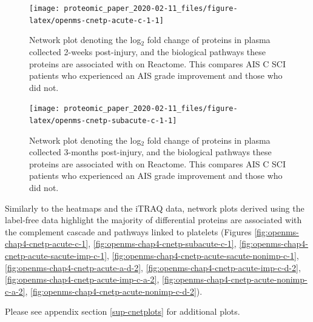 \documentclass[9pt,lineno]{elife}
\begin{document}
\begin{landscape}



\begin{figure}

{\centering \texttt{[image: proteomic\_paper\_2020-02-11\_files/figure-latex/openms-cnetp-acute-c-1-1]} 

}

\caption{Network plot denoting the log\(_2\) fold change of proteins in plasma collected 2-weeks post-injury, and the biological pathways these proteins are associated with on Reactome. This compares AIS C SCI patients who experienced an AIS grade improvement and those who did not.}\label{fig:openms-cnetp-acute-c-1}
\end{figure}

\end{landscape}
\begin{landscape}



\begin{figure}

{\centering \texttt{[image: proteomic\_paper\_2020-02-11\_files/figure-latex/openms-cnetp-subacute-c-1-1]} 

}

\caption{Network plot denoting the log\(_2\) fold change of proteins in plasma collected 3-months post-injury, and the biological pathways these proteins are associated with on Reactome. This compares AIS C SCI patients who experienced an AIS grade improvement and those who did not.}\label{fig:openms-cnetp-subacute-c-1}
\end{figure}

\end{landscape}

\clearpage

Similarly to the heatmaps and the iTRAQ data, network plots derived using the label-free data highlight the majority of differential proteins are associated with the complement cascade and pathways linked to platelets (Figures \ref{fig:openms-chap4-cnetp-acute-c-1}, \ref{fig:openms-chap4-cnetp-subacute-c-1}, \ref{fig:openms-chap4-cnetp-acute-sacute-imp-c-1}, \ref{fig:openms-chap4-cnetp-acute-sacute-nonimp-c-1}, \ref{fig:openms-chap4-cnetp-acute-a-d-2}, \ref{fig:openms-chap4-cnetp-acute-imp-c-d-2}, \ref{fig:openms-chap4-cnetp-acute-imp-c-a-2}, \ref{fig:openms-chap4-cnetp-acute-nonimp-c-a-2}, \ref{fig:openms-chap4-cnetp-acute-nonimp-c-d-2}).

Please see appendix section \ref{sup-cnetplots} for additional plots.
\end{document}
